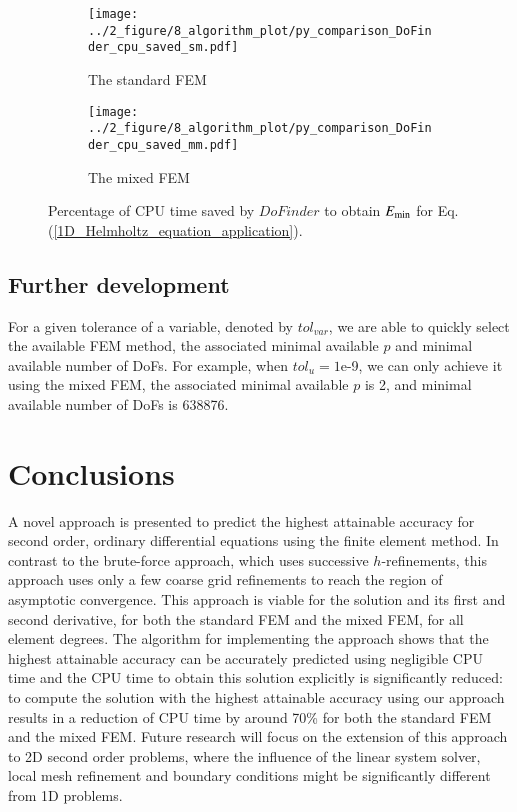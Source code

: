 \documentclass[review,3p]{elsarticle}
\begin{document}
\begin{figure}[!ht]
	\centering
    \begin{subfigure}{6.0cm}
        \texttt{[image: ../2\_figure/8\_algorithm\_plot/py\_comparison\_DoFinder\_cpu\_saved\_sm.pdf]}
        \caption{The standard FEM}
        \label{CPU_saved_sm}
    \end{subfigure}
    \begin{subfigure}{6.0cm}	                		 	
        \texttt{[image: ../2\_figure/8\_algorithm\_plot/py\_comparison\_DoFinder\_cpu\_saved\_mm.pdf]}
        \caption{The mixed FEM}
        \label{CPU_saved_mm}
    \end{subfigure}
\caption{Percentage of CPU time saved by $DoFinder$ to obtain $E_{\rm min}$ for Eq. (\ref{1D_Helmholtz_equation_application}).}
\label{CPU_saved}
\end{figure}

\subsection{Further development}						\label{section_further_development}

For a given tolerance of a variable, denoted by $tol_{var}$, we are able to quickly select the available FEM method, the associated minimal available $p$ and minimal available number of DoFs. For example, when $tol_{u}=1$e-9, we can only achieve it using the mixed FEM, the associated minimal available $p$ is 2, and minimal available number of DoFs is 638876.

\section{Conclusions}		\label{paragraph on conclusion}

A novel approach is presented to predict the highest attainable accuracy for second order, ordinary differential equations using the finite element method.
In contrast to the brute-force approach, which uses successive $h$-refinements, this approach uses only a few coarse grid refinements to reach the region of asymptotic convergence. 
This approach is viable for the solution and its first and second derivative, for both the standard FEM and the mixed FEM, for all element degrees.
The algorithm for implementing the approach shows that the highest attainable accuracy can be accurately predicted using negligible CPU time and the CPU time to obtain this solution explicitly is significantly reduced: to compute the solution with the highest attainable accuracy using our approach results in a reduction of CPU time by around 70\% for both the standard FEM and  the mixed FEM.
Future research will focus on the extension of this approach to 2D second order problems, where the influence of the linear system solver, local mesh refinement and boundary conditions might be significantly different from 1D problems. 
\end{document}
